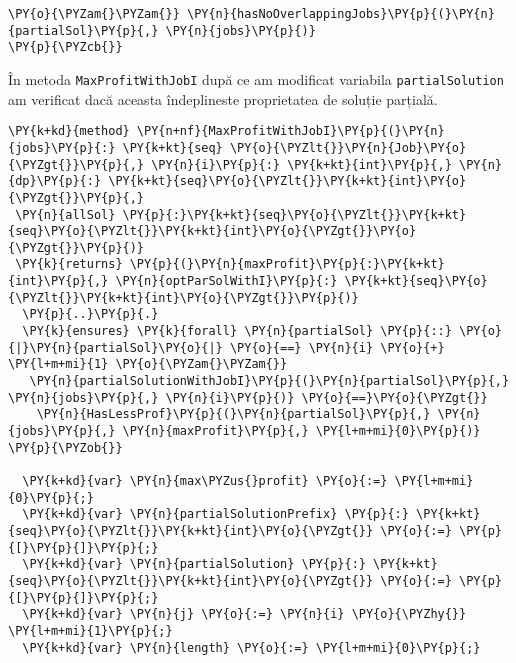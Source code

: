 \begin{enumerate}
\begin{Verbatim}[commandchars=\\\{\}, fontsize=\footnotesize]
   \PY{o}{\PYZam{}\PYZam{}} \PY{n}{hasNoOverlappingJobs}\PY{p}{(}\PY{n}{partialSol}\PY{p}{,} \PY{n}{jobs}\PY{p}{)}
\PY{p}{\PYZcb{}}
\end{Verbatim}
În metoda \texttt{MaxProfitWithJobI} după ce am modificat variabila \texttt{partialSolution} am verificat dacă aceasta îndeplineste proprietatea de soluție parțială.
\begin{Verbatim}[commandchars=\\\{\},fontsize=\footnotesize]
\PY{k+kd}{method} \PY{n+nf}{MaxProfitWithJobI}\PY{p}{(}\PY{n}{jobs}\PY{p}{:} \PY{k+kt}{seq} \PY{o}{\PYZlt{}}\PY{n}{Job}\PY{o}{\PYZgt{}}\PY{p}{,} \PY{n}{i}\PY{p}{:} \PY{k+kt}{int}\PY{p}{,} \PY{n}{dp}\PY{p}{:} \PY{k+kt}{seq}\PY{o}{\PYZlt{}}\PY{k+kt}{int}\PY{o}{\PYZgt{}}\PY{p}{,}
 \PY{n}{allSol} \PY{p}{:}\PY{k+kt}{seq}\PY{o}{\PYZlt{}}\PY{k+kt}{seq}\PY{o}{\PYZlt{}}\PY{k+kt}{int}\PY{o}{\PYZgt{}}\PY{o}{\PYZgt{}}\PY{p}{)}
 \PY{k}{returns} \PY{p}{(}\PY{n}{maxProfit}\PY{p}{:}\PY{k+kt}{int}\PY{p}{,} \PY{n}{optParSolWithI}\PY{p}{:} \PY{k+kt}{seq}\PY{o}{\PYZlt{}}\PY{k+kt}{int}\PY{o}{\PYZgt{}}\PY{p}{)}
  \PY{p}{..}\PY{p}{.}
  \PY{k}{ensures} \PY{k}{forall} \PY{n}{partialSol} \PY{p}{::} \PY{o}{|}\PY{n}{partialSol}\PY{o}{|} \PY{o}{==} \PY{n}{i} \PY{o}{+} \PY{l+m+mi}{1} \PY{o}{\PYZam{}\PYZam{}}
   \PY{n}{partialSolutionWithJobI}\PY{p}{(}\PY{n}{partialSol}\PY{p}{,} \PY{n}{jobs}\PY{p}{,} \PY{n}{i}\PY{p}{)} \PY{o}{==}\PY{o}{\PYZgt{}}
    \PY{n}{HasLessProf}\PY{p}{(}\PY{n}{partialSol}\PY{p}{,} \PY{n}{jobs}\PY{p}{,} \PY{n}{maxProfit}\PY{p}{,} \PY{l+m+mi}{0}\PY{p}{)}
\PY{p}{\PYZob{}}

  \PY{k+kd}{var} \PY{n}{max\PYZus{}profit} \PY{o}{:=} \PY{l+m+mi}{0}\PY{p}{;}
  \PY{k+kd}{var} \PY{n}{partialSolutionPrefix} \PY{p}{:} \PY{k+kt}{seq}\PY{o}{\PYZlt{}}\PY{k+kt}{int}\PY{o}{\PYZgt{}} \PY{o}{:=} \PY{p}{[}\PY{p}{]}\PY{p}{;}
  \PY{k+kd}{var} \PY{n}{partialSolution} \PY{p}{:} \PY{k+kt}{seq}\PY{o}{\PYZlt{}}\PY{k+kt}{int}\PY{o}{\PYZgt{}} \PY{o}{:=} \PY{p}{[}\PY{p}{]}\PY{p}{;}
  \PY{k+kd}{var} \PY{n}{j} \PY{o}{:=} \PY{n}{i} \PY{o}{\PYZhy{}} \PY{l+m+mi}{1}\PY{p}{;}
  \PY{k+kd}{var} \PY{n}{length} \PY{o}{:=} \PY{l+m+mi}{0}\PY{p}{;}
  

\end{Verbatim}
\end{enumerate}
